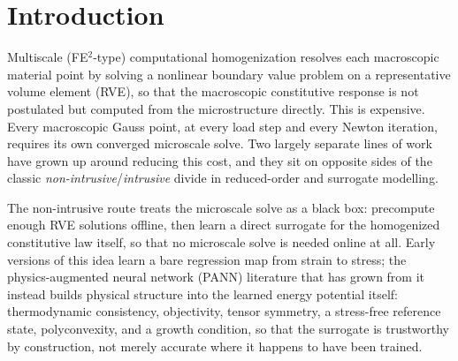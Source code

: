\documentclass[10pt,a4paper]{article}
\begin{document}
\section{Introduction}
\label{sec:introduction}
Multiscale (FE$^2$-type) computational homogenization
resolves each macroscopic material point by solving a nonlinear boundary
value problem on a representative volume element (RVE), so that the
macroscopic constitutive response is not postulated but computed from the
microstructure directly. This is expensive. Every macroscopic Gauss point,
at every load step and every Newton iteration, requires its own converged
microscale solve. Two largely separate lines of work have grown up around
reducing this cost, and they sit on opposite sides of the classic
\emph{non-intrusive}/\emph{intrusive} divide in reduced-order and
surrogate modelling.

The non-intrusive route treats the microscale solve as a black
box: precompute enough RVE solutions offline, then learn a direct
surrogate for the homogenized constitutive law itself, so that no
microscale solve is needed online at all. Early versions of this idea
learn a bare regression map from strain to stress; the physics-augmented
neural network (PANN) literature that has grown from
it~\cite{Klein2022,Linden2023,Asad2022} instead builds physical structure
into the learned energy potential itself: thermodynamic consistency,
objectivity, tensor symmetry, a stress-free reference state,
polyconvexity, and a growth condition, so that the surrogate is
trustworthy by construction, not merely accurate where it happens to have
been trained.
\end{document}
